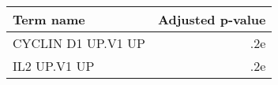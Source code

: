\begin{tabular}{lr}
\toprule
         Term name &  Adjusted p-value \\
\midrule
CYCLIN D1 UP.V1 UP &               .2e \\
      IL2 UP.V1 UP &               .2e \\
\bottomrule
\end{tabular}
